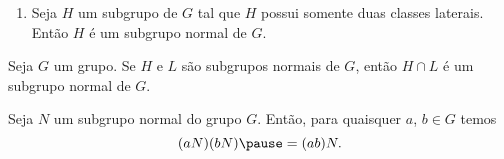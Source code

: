 \documentclass{beamer}
\begin{document}
    \begin{frame}
        \begin{exemplos}
            \begin{enumerate}[label=({\arabic*})]
                \conti

                \item Seja $H$ um subgrupo de $G$ \pause tal que $H$ possui somente duas classes laterais. \pause Ent\~ao $H$ \'e um subgrupo normal de $G$.

                \seti
            \end{enumerate}
        \end{exemplos}
    \end{frame}

    \begin{frame}
        \begin{proposicao}
            Seja $G$ um grupo. \pause Se $H$ e $L$ s\~ao subgrupos normais de $G$, \pause ent\~ao $H \cap L$ \pause \'e um subgrupo normal de $G$.
        \end{proposicao}
    \end{frame}

    \begin{frame}
        \begin{proposicao}
            Seja $N$ um subgrupo normal \pause do grupo $G$. \pause Ent\~ao, para quaisquer $a$, $b \in G$ temos \pause
            \[
                (aN)(bN) \pause = (ab)N.
            \]
        \end{proposicao}
    \end{frame}
\end{document}

